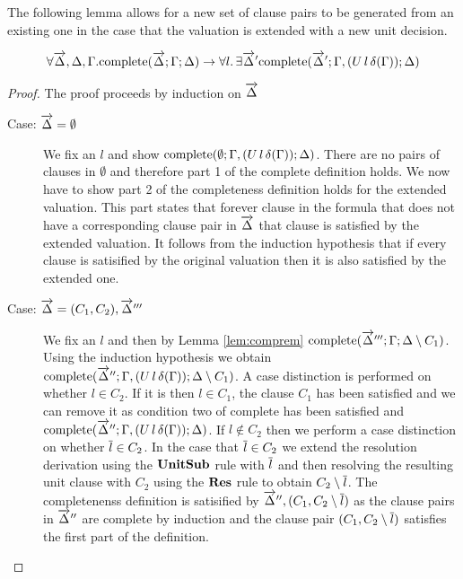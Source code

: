 The following lemma allows for a new set of clause pairs to be generated from an existing one in the case that the valuation is extended with a new unit decision.

\begin{mylemma}\label{lem:compunit}
\begin{align*}\forall \overrightarrow{\Delta},\Delta,\Gamma.  \mathrm{complete}(\overrightarrow{\Delta};\Gamma; \Delta) \to \forall l. \, \exists \overrightarrow{\Delta}' \mathrm{complete}(\overrightarrow{\Delta}';\Gamma, (U \, l \, \delta(\Gamma)); \Delta)
\end{align*}
\begin{proof}
The proof proceeds by induction on $\overrightarrow{\Delta}$
\begin{description}
\item[Case: $\overrightarrow{\Delta} = \emptyset$] 
We fix an $l$ and show $\mathrm{complete}(\emptyset;\Gamma, (U \, l \, \delta(\Gamma)); \Delta)$.  There are no pairs of clauses in $\emptyset$ and therefore part 1 of the $\mathrm{complete}$ definition holds. We now have to show part 2 of the completeness definition holds for the extended valuation. This part states that forever clause in the formula that does not have a corresponding clause pair in $\overrightarrow{\Delta}$ that clause is satisfied by the extended valuation.  It follows from the induction hypothesis that if every clause is satisified by the original valuation then it is also satisfied by the extended one.
\item[Case: $\overrightarrow{\Delta} = (C_1, C_2), \overrightarrow{\Delta}'''$] We fix an $l$ and then by Lemma \ref{lem:comprem} $\mathrm{complete}(\overrightarrow{\Delta}''';\Gamma; \Delta \setminus C_1)$. Using the induction hypothesis we obtain $\mathrm{complete}(\overrightarrow{\Delta}'';\Gamma, (U \, l \, \delta(\Gamma)); \Delta \setminus C_1)$. A case distinction is performed on whether $l \in C_2$. If it is then $l \in C_1$, the clause $C_1$ has been satisfied and we can remove it as condition two of $\mathrm{complete}$ has been satisfied and $\mathrm{complete}(\overrightarrow{\Delta}'';\Gamma, (U \, l \, \delta(\Gamma)); \Delta)$. If $l \notin C_2$ then we perform a case distinction on whether $\overline{l} \in C_2$. In the case that $\overline{l} \in C_2$ we extend the resolution derivation using the $\mathbf{UnitSub}$ rule with $\overline{l}$ and then resolving the resulting unit clause with $C_2$ using the $\mathbf{Res}$ rule to obtain $C_2 \setminus \overline{l}$. The completenenss definition is satisified by $\overrightarrow{\Delta}'',(C_1, C_2 \setminus \overline{l})$ as the clause pairs in $\overrightarrow{\Delta}''$ are complete by induction and the clause pair $(C_1, C_2 \setminus \overline{l})$ satisfies the first part of the definition. 
\end{description}
\end{proof}
\end{mylemma}

